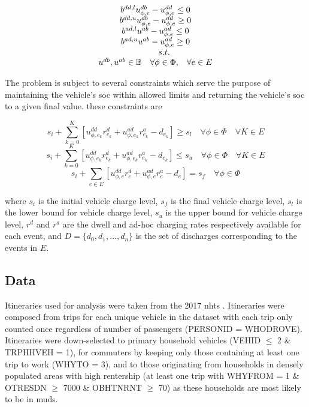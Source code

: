 \documentclass[letterpaper]{sae}
\begin{document}
\begin{equation}
	\begin{array}{ccc}
		\multicolumn{3}{c}{b^{dd,l}u_{\phi,e}^{db}-u_{\phi,e}^{dd}\leq 0}\\
		\multicolumn{3}{c}{b^{dd,u}u_{\phi,e}^{db}-u_{\phi,e}^{dd}\geq 0}\\
		\multicolumn{3}{c}{b^{ad,l}u^{ab}-u_{\phi,e}^{ad}\leq 0}\\
		\multicolumn{3}{c}{b^{ad,u}u^{ab}-u_{\phi,e}^{ad}\geq 0}\\
		& s.t. & \\
		u^{db}, u^{ab}\in\mathbb{B} & \forall \phi\in \Phi,& \forall e\in E\\
	\end{array}
\end{equation}

The problem is subject to several constraints which serve the purpose of maintaining the vehicle's \gls{soc} within allowed limits and returning the vehicle's \gls{soc} to a given final value. these constraints are

\begin{equation}
	s_i+\sum_{k=0}^{K}[u_{\phi,e_k}^{dd}r_{e_k}^{d}+u_{\phi,e_k}^{ad}r_{e_k}^{a}-d_{e_k}]\geq s_{l}\quad \forall \phi\in \Phi\quad \forall K\in E
\end{equation}
\begin{equation}
	s_i+\sum_{k=0}^{K}[u_{\phi,e_k}^{dd}r_{e_k}^{d}+u_{\phi,e_k}^{ad}r_{e_k}^{a}-d_{e_k}]\leq s_{u}\quad \forall \phi\in \Phi\quad \forall K\in E
\end{equation}
\begin{equation}
	s_i+\sum_{e\in E}[u_{\phi,e}^{dd}r_{e}^{d}+u_{\phi,e}^{ad}r_{e}^{a}-d_{e}]=s_f\quad \forall \phi\in \Phi
\end{equation}

where $s_i$ is the initial vehicle charge level, $s_f$ is the final vehicle charge level, $s_{l}$ is the lower bound for vehicle charge level, $s_{u}$ is the upper bound for vehicle charge level, $r^d$ and $r^a$ are the dwell and ad-hoc charging rates respectively available for each event, and $D=\{d_0,d_1,\dots,d_n\}$ is the set of discharges corresponding to the events in $E$.

\subsection{Data}\label{sec:data}

Itineraries used for analysis were taken from the 2017 \gls{nhts} \cite{FHA_2017}. Itineraries were composed from trips for each unique vehicle in the dataset with each trip only counted once regardless of number of passengers (PERSONID = WHODROVE). Itineraries were down-selected to primary household vehicles (VEHID $\leq$ 2 \& TRPHHVEH = 1), for commuters by keeping only those containing at least one trip to work (WHYTO = 3), and to those originating from households in densely populated areas with high rentership (at least one trip with WHYFROM = 1 \& OTRESDN $\geq$ 7000 \&  OBHTNRNT $\geq$ 70) as these households are most likely to be in \glspl{mud}.
\end{document}
